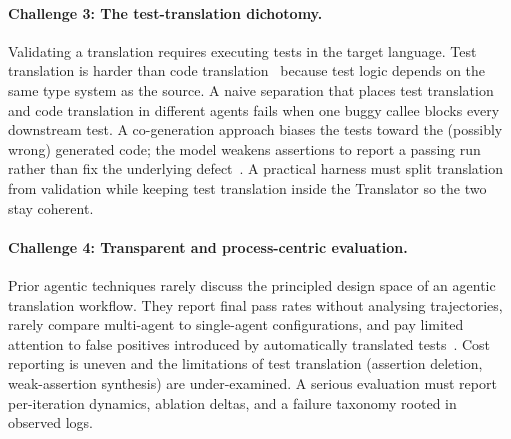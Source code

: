 \paragraph{Challenge 3: The test-translation dichotomy.}
Validating a translation requires executing tests in the target language.
Test translation is harder than code translation~\cite{p45_translation_bugs}
because test logic depends on the same type system as the source. A naive
separation that places test translation and code translation in different
agents fails when one buggy callee blocks every downstream test. A
co-generation approach biases the tests toward the (possibly wrong)
generated code; the model weakens assertions to report a passing run
rather than fix the underlying defect~\cite{p25_advtestgen,p02_alphatrans}.
A practical harness must split translation from validation while keeping
test translation inside the Translator so the two stay coherent.

\paragraph{Challenge 4: Transparent and process-centric evaluation.}
Prior agentic techniques rarely discuss the principled design space of
an agentic translation workflow. They report final pass rates without
analysing trajectories, rarely compare multi-agent to single-agent
configurations, and pay limited attention to false positives introduced
by automatically translated tests~\cite{p02_alphatrans}. Cost reporting
is uneven and the limitations of test translation (assertion deletion,
weak-assertion synthesis) are under-examined. A serious evaluation must
report per-iteration dynamics, ablation deltas, and a failure taxonomy
rooted in observed logs.

